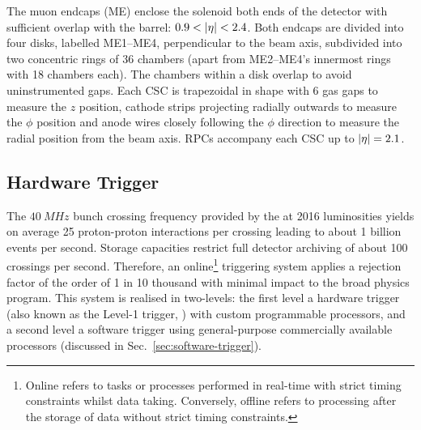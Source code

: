 The muon endcaps (ME) enclose the solenoid both ends of the \CMS detector with sufficient overlap with the barrel: $0.9<\aeta<2.4$. Both endcaps are divided into four disks, labelled ME1--ME4, perpendicular to the beam axis, subdivided into two concentric rings of 36 chambers (apart from ME2--ME4's innermost rings with 18 chambers each). The chambers within a disk overlap to avoid uninstrumented gaps. Each CSC is trapezoidal in shape with 6 gas gaps to measure the $z$ position, cathode strips projecting radially outwards  to measure the $\phi$ position and anode wires closely following the $\phi$ direction to measure the radial position from the beam axis. RPCs accompany each CSC up to $|\eta|=2.1$.


\subsection{Hardware Trigger}\label{sec:hardware-trigger}

The ${\SI{40}{MHz}}$ bunch crossing frequency provided by the \LHC at 2016 luminosities yields on average 25 proton-proton interactions per crossing leading to about 1 billion events per second. Storage capacities restrict full detector archiving of about 100 crossings per second. Therefore, an online\footnote{Online refers to tasks or processes performed in real-time with strict timing constraints whilst data taking. Conversely, offline refers to processing after the storage of data without strict timing constraints.} triggering system applies a rejection factor of the order of 1 in 10 thousand with minimal impact to the broad physics program. This system is realised in two-levels: the first level a hardware trigger (also known as the Level-1 trigger, \HWT) \cite{Bayatyan:706847,Tapper:1556311} with custom programmable processors, and a second level a software trigger \cite{Sphicas:2002gg} using general-purpose commercially available processors (discussed in Sec.~\ref{sec:software-trigger}).

